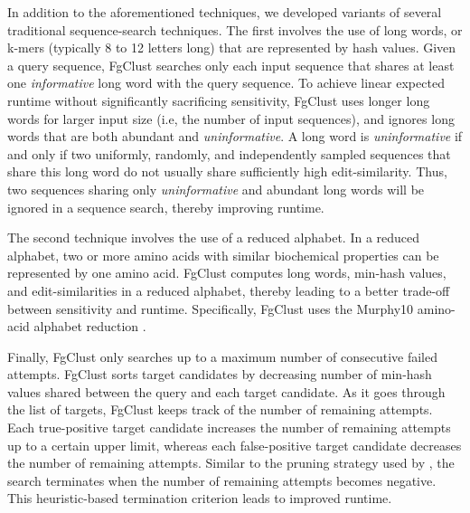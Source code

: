 \documentclass[11pt,letterpaper]{article}
\begin{document}
In addition to the aforementioned techniques, we developed variants of several traditional sequence-search techniques.
The first involves the use of long words, or k-mers (typically 8 to 12 letters long) that are represented by hash values.
Given a query sequence, FgClust searches only each input sequence that shares at least one \textit{informative} long word with the query sequence.
To achieve linear expected runtime without significantly sacrificing sensitivity, FgClust uses longer long words for larger input size (i.e, the number of input sequences), and ignores long words that are both abundant and \textit{uninformative}.
A long word is \textit{uninformative} if and only if two uniformly, randomly, and independently sampled sequences that share this long word do not usually share sufficiently high edit-similarity.
Thus, two sequences sharing only \textit{uninformative} and abundant long words will be ignored in a sequence search, thereby improving runtime.

The second technique involves the use of a reduced alphabet. 
In a reduced alphabet, two or more amino acids with similar biochemical properties can be represented by one amino acid.
FgClust computes long words, min-hash values, and edit-similarities in a reduced alphabet, thereby leading to a better trade-off between sensitivity and runtime.
Specifically, FgClust uses the Murphy10 amino-acid alphabet reduction \citep{murphy2000simplified}.

Finally, FgClust only searches up to a maximum number of consecutive failed attempts.
FgClust sorts target candidates by decreasing number of min-hash values shared between the query and each target candidate.
As it goes through the list of targets, FgClust keeps track of the number of remaining attempts.
Each true-positive target candidate increases the number of remaining attempts up to a certain upper limit, whereas each false-positive target candidate decreases the number of remaining attempts.
Similar to the pruning strategy used by \citet{edgar2010search}, the search terminates when the number of remaining attempts becomes negative.
This heuristic-based termination criterion leads to improved runtime.
\end{document}
